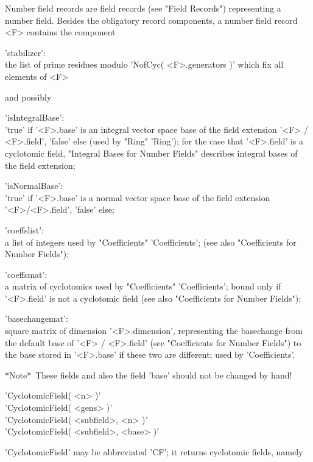 Number field records are field records (see "Field Records") representing
a number field.  Besides the obligatory record components, a number field
record <F> contains the component

'stabilizer':\\
     the list of prime residues modulo 'NofCyc( <F>.generators )' which
     fix all elements of <F>

and possibly

'isIntegralBase':\\
     'true' if '<F>.base' is an integral vector space base of the field
     extension '<F> / <F>.field', 'false' else (used by "Ring" 'Ring');
     for the case that '<F>.field' is a cyclotomic field,
     "Integral Bases for Number Fields" describes integral bases of the
     field extension;

'isNormalBase':\\
     'true' if '<F>.base' is a normal vector space base of the field
     extension '<F>/<F>.field', 'false' else;

'coeffslist':\\
     a list of integers used by "Coefficients" 'Coefficients'; (see also
     "Coefficients for Number Fields");

'coeffsmat':\\
     a matrix of cyclotomics used by "Coefficients" 'Coefficients';
     bound only if '<F>.field' is not a cyclotomic field
     (see also "Coefficients for Number Fields");

'basechangemat':\\
     square matrix of dimension '<F>.dimension', representing the
     basechange from the default base of '<F> / <F>.field'
     (see "Coefficients for Number Fields") to the base stored
     in '<F>.base' if these two are different; used by 'Coefficients'.

*Note*\:\ These fields and also the field 'base' should not be changed by
          hand!


'CyclotomicField( <n> )'\\
'CyclotomicField( <gens> )'\\
'CyclotomicField( <subfield>, <n> )'\\
'CyclotomicField( <subfield>, <base> )'

'CyclotomicField' may be abbreviated 'CF'; it returns cyclotomic fields,
namely

